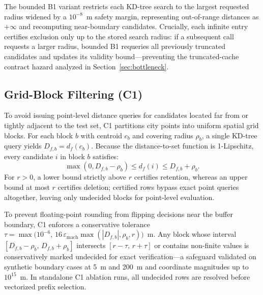 \documentclass[sigconf, nonacm]{acmart}
\begin{document}
The bounded B1 variant restricts each KD-tree search to the largest requested radius widened by a $10^{-8}$~m safety margin, representing out-of-range distances as $+\infty$ and recomputing near-boundary candidates. Crucially, each infinite entry certifies exclusion only up to the stored search radius: if a subsequent call requests a larger radius, bounded B1 requeries all previously truncated candidates and updates its validity bound---preventing the truncated-cache contract hazard analyzed in Section~\ref{sec:bottleneck}.

\subsection{Grid-Block Filtering (C1)}
To avoid issuing point-level distance queries for candidates located far from or tightly adjacent to the test set, C1 partitions city points into uniform spatial grid blocks. For each block $b$ with centroid $c_b$ and covering radius $\rho_b$, a single KD-tree query yields $D_{f,b}=d_f(c_b)$. Because the distance-to-set function is 1-Lipschitz, every candidate $i$ in block $b$ satisfies:
\begin{equation}
\max(0, D_{f,b}-\rho_b)\le d_f(i)\le D_{f,b}+\rho_b.
\label{eq:block}
\end{equation}
For $r>0$, a lower bound strictly above $r$ certifies retention, whereas an upper bound at most $r$ certifies deletion; certified rows bypass exact point queries altogether, leaving only undecided blocks for point-level evaluation.

To prevent floating-point rounding from flipping decisions near the buffer boundary, C1 enforces a conservative tolerance $\tau=\max\bigl(10^{-6},\,16\,\varepsilon_{\mathrm{mach}}\max(|D_{f,b}|,\rho_b,r)\bigr)$~m. Any block whose interval $[D_{f,b}-\rho_b,\,D_{f,b}+\rho_b]$ intersects $[r-\tau,\,r+\tau]$ or contains non-finite values is conservatively marked undecided for exact verification---a safeguard validated on synthetic boundary cases at 5~m and 200~m and coordinate magnitudes up to $10^{15}$~m. In standalone C1 ablation runs, all undecided rows are resolved before vectorized prefix selection.
\end{document}
